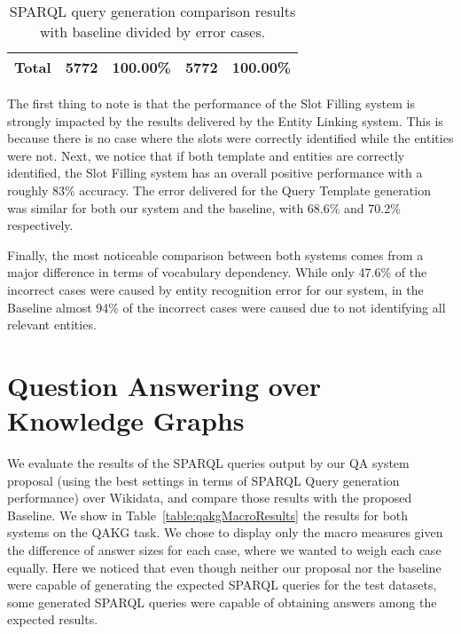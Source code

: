 \begin{table}[h!]
\begin{tabular}{|ccc|cc|cc|}
    \multicolumn{3}{|c|}{\textbf{Total}}                                                                                                                 & 5772                                                                                     & 100.00\%                                                       & 5772                                                                                     & 100.00\%                                                       \\ \hline
    \end{tabular}
    \caption{SPARQL query generation comparison results with baseline divided by error cases.}
    \label{table:queryGenerationErrorRatio}
\end{table}

The first thing to note is that the performance of the Slot Filling system is strongly impacted 
by the results delivered by the Entity Linking system. This is because there is no case where the 
slots were correctly identified while the entities were not. Next, we notice that if both 
template and entities are correctly identified, the Slot Filling system has an overall positive 
performance with a roughly 83\% accuracy. The error delivered for the Query Template generation 
was similar for both our system and the baseline, with 68.6\% and 70.2\% respectively.

Finally, the most noticeable comparison between both systems comes from a major difference in 
terms of vocabulary dependency. While only 47.6\% of the incorrect cases were caused by entity 
recognition error for our system, in the Baseline almost 94\% of the incorrect cases were caused 
due to not identifying all relevant entities.

\section{Question Answering over Knowledge Graphs}
\label{cap5:results/questionAnsweringKG}
We evaluate the results of the SPARQL queries output by our QA system proposal (using the best 
settings in terms of SPARQL Query generation performance) over Wikidata, and compare those results 
with the proposed Baseline. We show in Table~\ref{table:qakgMacroResults} the results for both 
systems on  the QAKG task. We chose to display only the macro measures given the difference of answer 
sizes for each case, where we wanted to weigh each case equally. Here we noticed that even though 
neither our proposal nor the baseline were capable of generating the expected SPARQL queries for 
the test datasets, some generated SPARQL queries were capable of obtaining answers among the 
expected results. 

